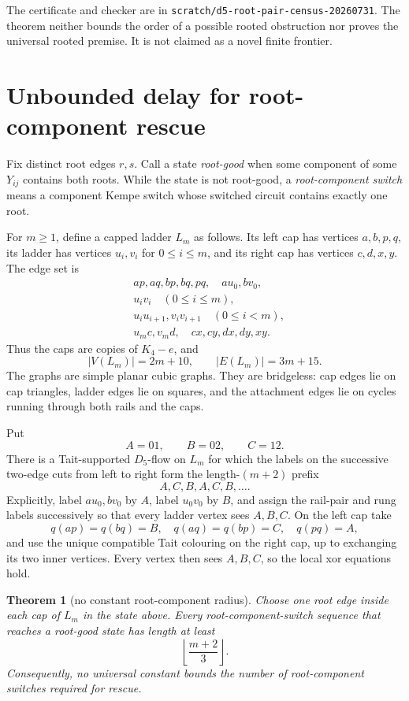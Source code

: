 \documentclass[11pt]{article}
\newtheorem{theorem}{Theorem}
\theoremstyle{definition}
\theoremstyle{remark}
\begin{document}
The certificate and checker are in
\texttt{scratch/d5-root-pair-census-20260731}.  The theorem neither bounds
the order of a possible rooted obstruction nor proves the universal rooted
premise.  It is not claimed as a novel finite frontier.

\section{Unbounded delay for root-component rescue}

Fix distinct root edges \(r,s\).  Call a state \emph{root-good} when some
component of some \(Y_{ij}\) contains both roots.  While the state is not
root-good, a \emph{root-component switch} means a component Kempe switch
whose switched circuit contains exactly one root.

For \(m\geq1\), define a capped ladder \(L_m\) as follows.  Its left cap
has vertices \(a,b,p,q\), its ladder has vertices \(u_i,v_i\) for
\(0\leq i\leq m\), and its right cap has vertices \(c,d,x,y\).  The edge
set is
\[
\begin{split}
 &ap,aq,bp,bq,pq,\quad au_0,bv_0,\\
 &u_iv_i\quad(0\leq i\leq m),\\
 &u_iu_{i+1},v_iv_{i+1}\quad(0\leq i<m),\\
 &u_mc,v_md,\quad cx,cy,dx,dy,xy.
\end{split}
\]
Thus the caps are copies of \(K_4-e\), and
\[
                  |V(L_m)|=2m+10,\qquad |E(L_m)|=3m+15.
\]
The graphs are simple planar cubic graphs.  They are bridgeless: cap
edges lie on cap triangles, ladder edges lie on squares, and the
attachment edges lie on cycles running through both rails and the caps.

Put
\[
                         A=01,\qquad B=02,\qquad C=12.
\]
There is a Tait-supported \(D_5\)-flow on \(L_m\) for which the labels on
the successive two-edge cuts from left to right form the length-\((m+2)\)
prefix
\[
                         A,C,B,A,C,B,\ldots.
\]
Explicitly, label \(au_0,bv_0\) by \(A\), label \(u_0v_0\) by \(B\),
and assign the rail-pair and rung labels successively so that every
ladder vertex sees \(A,B,C\).  On the left cap take
\[
 q(ap)=q(bq)=B,\quad q(aq)=q(bp)=C,\quad q(pq)=A,
\]
and use the unique compatible Tait colouring on the right cap, up to
exchanging its two inner vertices.  Every vertex then sees \(A,B,C\),
so the local xor equations hold.

\begin{theorem}[no constant root-component radius]
\label{thm:unbounded-root-radius}
Choose one root edge inside each cap of \(L_m\) in the state above.
Every root-component-switch sequence that reaches a root-good state has
length at least
\[
                         \left\lfloor\frac{m+2}{3}\right\rfloor.
\]
Consequently, no universal constant bounds the number of
root-component switches required for rescue.
\end{theorem}
\end{document}
